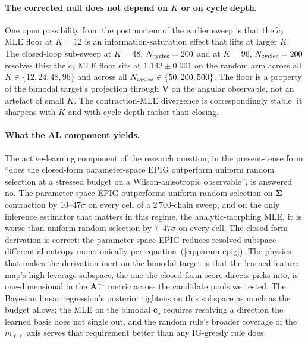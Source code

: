 \documentclass[11pt,a4paper]{article}
\newcommand{\mll}{m_{\ell\ell}}
\begin{document}
\paragraph{The corrected null does not depend on $K$ or on cycle depth.}
One open possibility from the postmortem of the earlier sweep is that the $\tilde c_2$ MLE floor at $K = 12$ is an information-saturation effect that lifts at larger $K$. The closed-loop sub-sweep at $K = 48$, $N_{\rm cycles} = 200$ and at $K = 96$, $N_{\rm cycles} = 200$ resolves this: the $\tilde c_2$ MLE floor sits at $1.142 \pm 0.001$ on the random arm across all $K \in \{12, 24, 48, 96\}$ and across all $N_{\rm cycles} \in \{50, 200, 500\}$. The floor is a property of the bimodal target's projection through $\bm{V}$ on the angular observable, not an artefact of small $K$. The contraction-MLE divergence is correspondingly stable: it sharpens with $K$ and with cycle depth rather than closing.

\paragraph{What the AL component yields.}
The active-learning component of the research question, in the present-tense form ``does the closed-form parameter-space EPIG outperform uniform random selection at a stressed budget on a Wilson-anisotropic observable'', is answered no. The parameter-space EPIG outperforms uniform random selection on $\bm{\Sigma}$ contraction by $10$--$47\sigma$ on every cell of a $2\,700$-chain sweep, and on the only inference estimator that matters in this regime, the analytic-morphing MLE, it is worse than uniform random selection by $7$--$47\sigma$ on every cell. The closed-form derivation is correct: the parameter-space EPIG reduces resolved-subspace differential entropy monotonically per equation~(\ref{eq:param-epig}). The physics that makes the derivation inert on the bimodal target is that the learned feature map's high-leverage subspace, the one the closed-form score directs picks into, is one-dimensional in the $\bm{A}^{-1}$ metric across the candidate pools we tested. The Bayesian linear regression's posterior tightens on this subspace as much as the budget allows; the MLE on the bimodal $\bm{c}_\star$ requires resolving a direction the learned basis does not single out, and the random rule's broader coverage of the $\mll$ axis serves that requirement better than any IG-greedy rule does.
\end{document}

